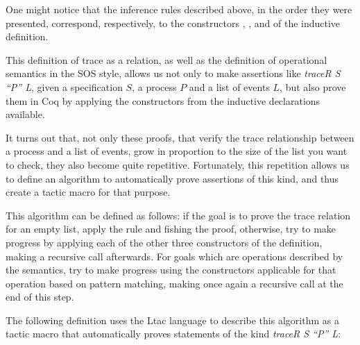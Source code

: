 One might notice that the inference rules described above, in the order they were presented, correspond, respectively, to the constructors  , , and  of the  inductive definition.

This definition of trace as a relation, as well as the definition of operational semantics in the SOS style, allows us not only to make assertions like \emph{traceR S ``P'' L}, given a specification $ S $, a process $ P $ and a list of events $ L $, but also prove them in Coq by applying the constructors from the inductive declarations available.

It turns out that, not only these proofs, that verify the trace relationship between a process and a list of events, grow in proportion to the size of the list you want to check, they also become quite repetitive. Fortunately, this repetition allows us to define an algorithm to automatically prove assertions of this kind, and thus create a tactic macro for that purpose.

This algorithm can be defined as follows: if the goal is to prove the trace relation for an empty list, apply the rule  and fishing the proof, otherwise, try to make progress by applying each of the other three constructors of the  definition, making a recursive call afterwards. For goals which are operations described by the \CSPcoq{} semantics, try to make progress using the constructors applicable for that operation based on pattern matching, making once again a recursive call at the end of this step.

The following definition uses the Ltac language to describe this algorithm as a tactic macro that automatically proves statements of the kind \emph{traceR S ``P'' L}:

